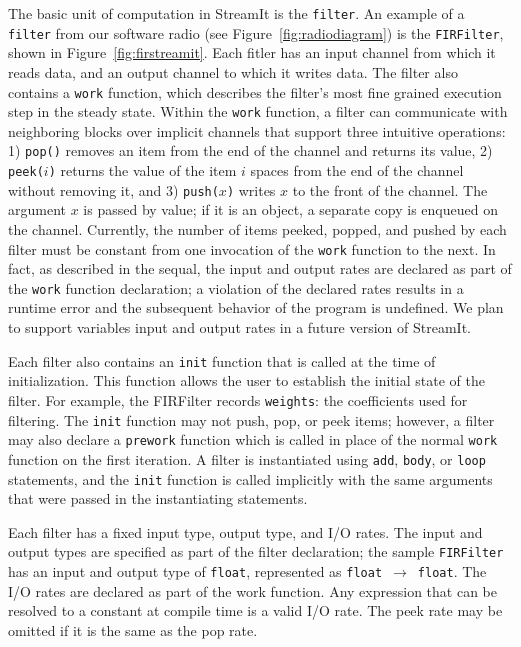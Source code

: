 The basic unit of computation  in StreamIt is the \texttt{filter}.  An
example   of  a   \texttt{filter}   from  our   software  radio   (see
Figure~\ref{fig:radiodiagram})  is  the  \texttt{FIRFilter}, shown  in
Figure~\ref{fig:firstreamit}.  Each  fitler has an  input channel from
which it  reads data, and an  output channel to which  it writes data.
The filter also contains a \texttt{work} function, which describes the
filter's most fine grained execution step in the steady state.  Within
the \texttt{work} function, a  filter can communicate with neighboring
blocks over implicit channels that support three intuitive operations:
1) \texttt{pop()}  removes an  item from  the end  of the  channel and
returns its value, 2) \texttt{peek($i$)} returns the value of the item
$i$ spaces  from the end  of the channel  without removing it,  and 3)
\texttt{push($x$)}  writes  $x$ to  the  front  of  the channel.   The
argument $x$ is  passed by value; if it is an  object, a separate copy
is enqueued  on the  channel. Currently, the  number of  items peeked,
popped, and pushed by each filter must be constant from one invocation
of the \texttt{work}  function to the next.  In  fact, as described in
the sequal,  the input and  output rates are  declared as part  of the
\texttt{work} function declaration; a  violation of the declared rates
results in a runtime error  and the subsequent behavior of the program
is undefined. We plan to support variables input and output rates in a
future version of StreamIt.

Each filter also contains an  \texttt{init} function that is called at
the  time  of  initialization.   This  function  allows  the  user  to
establish the initial state of the filter.  For example, the FIRFilter
records  \texttt{weights}: the coefficients  used for  filtering.  The
\texttt{init} function  may not push,  pop, or peek items;  however, a
filter may also declare a \texttt{prework} function which is called in
place of the normal \texttt{work}  function on the first iteration.  A
filter   is  instantiated   using   \texttt{add},  \texttt{body},   or
\texttt{loop}  statements, and  the \texttt{init}  function  is called
implicitly  with   the  same  arguments   that  were  passed   in  the
instantiating statements.

Each filter has  a fixed input type, output type,  and I/O rates.  The
input  and  output   types  are  specified  as  part   of  the  filter
declaration;  the sample  \texttt{FIRFilter} has  an input  and output
type         of         \texttt{float},         represented         as
\texttt{float}~$\rightarrow$~\texttt{float}.   The I/O rates  are declared
as part of the work function.   Any expression that can be resolved to
a constant at compile time is a  valid I/O rate.  The peek rate may be
omitted if it is the same as the pop rate.

